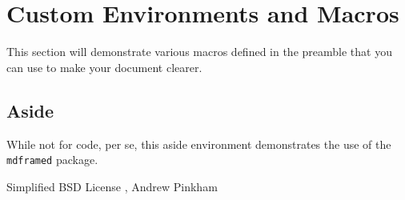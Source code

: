 \section[Macros]{Custom Environments and Macros}

This section will demonstrate various macros defined in the preamble that you can use to make your document clearer.

\subsection{Aside}

While not for code, per se, this aside environment demonstrates the use of the \verb|mdframed| package.

\begin{aside}
\lipsum[1] %
\end{aside}

\begin{center}
Simplified BSD License , Andrew Pinkham
 \end{center}


